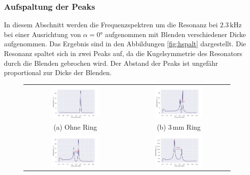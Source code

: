 \subsubsection{Aufspaltung der Peaks}
In diesem Abschnitt werden die Frequenzspektren um die Resonanz bei $2.3 \,\si{\kilo\hertz}$ bei einer Ausrichtung von $\alpha = 0°$ aufgenommen mit Blenden verschiedener Dicke aufgenommen. Das Ergebnis sind in den Abbildungen \ref{fig:hspalt} dargestellt. 
Die Resonanz spaltet sich in zwei Peaks auf, da die Kugelsymmetrie des Resonators durch die Blenden gebrochen wird. Der Abstand der Peaks ist ungefähr proportional zur Dicke der Blenden.
\begin{figure}[H]
  \centering
  \begin{tabular}{cc}
    \includegraphics[width=0.5\textwidth]{Daten/Wasserstoff/spalt0.pdf} &   \includegraphics[width=0.5\textwidth]{Daten/Wasserstoff/spalt1.pdf} \\
  (a) Ohne Ring & (b) $3 \,\si{\milli\metre}$ Ring \\[6pt]
  \includegraphics[width=0.5\textwidth]{Daten/Wasserstoff/spalt2.pdf} &   \includegraphics[width=0.5\textwidth]{Daten/Wasserstoff/spalt3.pdf} \\

\end{tabular}
\end{figure}
